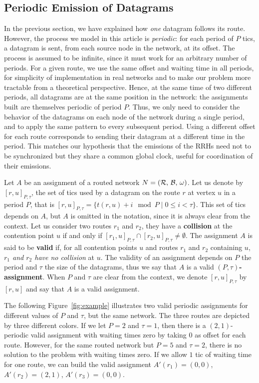 \documentclass[a4paper,10pt]{journal}
\begin{document}
 	\subsection{Periodic Emission of Datagrams}

	In the previous section, we have explained how \emph{one} datagram follows its route.
	However, the process we model in this article is \emph{periodic}: for each period of $P$ tics, a datagram is sent, from each source node in the network, at its offset. The process is assumed to be infinite, since it must work for an arbitrary number of periods. For a given route, we use the same offset and waiting time in all periods, for simplicity of implementation in real networks and to make our problem more tractable from a theoretical perspective. Hence, at the same time of two different periods, all datagrams are at the same position in the network: the assignments built are themselves periodic of period $P$. Thus, we only need to consider the behavior of the datagrams on each node of the network during a single period, and to apply the same pattern to every subsequent period. 
 	Using a different offset for each route corresponds to sending their datagram at a different time in the period. This matches our hypothesis that the emissions of the RRHs need not to be synchronized but they share a common global clock, useful for coordination of their emissions.

 	Let $A$ be an assignment of a routed network $N = (\cal{R},\,\cal{B},\,\omega)$.
    Let us denote by $[r,u]_{P,\tau}$, the set of tics used by a datagram on the route $r$ at vertex $u$ in a period $P$, that is $[r,u]_{P,\tau} = \{t(r,u) + i \mod P \mid 0 \leq i < \tau \}$. This set of tics depends on $A$,
    but $A$ is omitted in the notation, since it is always clear from the context.
    Let us consider two routes $r_1$ and $r_2$, they have a {\bf collision} at the contention point $u$ if and only if $[r_1,u]_{P,\tau} \cap [r_2,u]_{P,\tau} \neq \emptyset$.
    The assignment $A$ is said to be \textbf{valid} if, for all contention points $u$ and routes $r_1$ and $r_2$ containing $u$, \emph{$r_1$ and $r_2$ have no collision} at $u$. 
    The validity of an assignment depends on $P$ the period and $\tau$ the size of the datagrams,
    thus we say that $A$ is a valid \textbf{$(P,\tau)$-assignment}. When $P$ and $\tau$ are clear from the context, 
    we denote $[r,u]_{P,\tau}$ by $[r,u]$ and say that $A$ is a valid assignment. 

    The following Figure~\ref{fig:example} illustrates two valid periodic assignments for different values of $P$ and $\tau$, but the same network. The three routes are depicted by three different colors. If we let $P = 2$ and $\tau = 1$, then there is a $(2,1)$-periodic valid assignment with waiting times zero by taking $0$ as offset for each route. However, for the same routed network but $P=5$ and $\tau = 2$, there is no solution to the problem with waiting times zero. If we allow $1$ tic of waiting time for one route, we can build the valid assignment $A'(r_1) = (0,0)$, $A'(r_2) = (2,1)$, $A'(r_3)= (0,0)$.
\end{document}
